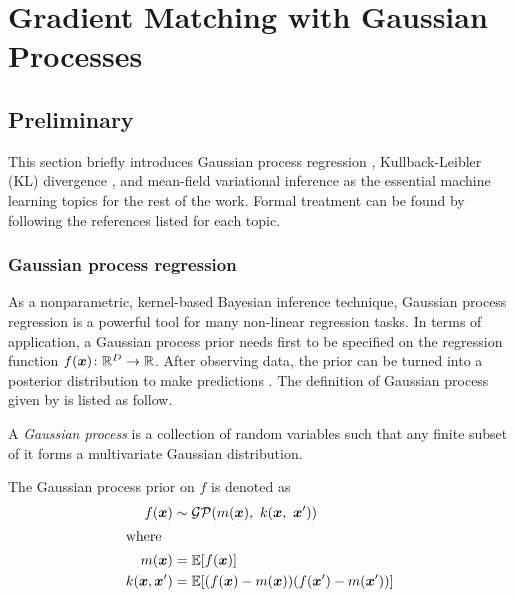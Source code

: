 \chapter{Gradient Matching with Gaussian Processes}
\label{ch-gmgp}

\section{Preliminary}
\label{sec-preliminary}
This section briefly introduces Gaussian process regression , Kullback-Leibler (KL) divergence , and mean-field variational inference  as the essential machine learning topics for the rest of the work.
Formal treatment can be found by following the references listed for each topic.

\subsection{Gaussian process regression}
\label{sec-gpr}

As a nonparametric, kernel-based Bayesian inference technique, Gaussian process regression is a powerful tool for many non-linear regression tasks.
In terms of application, a Gaussian process prior needs first to be specified on the regression function $f(\boldsymbol{x})\colon\mathbb{R}^D\rightarrow\mathbb{R}$. 
After observing data, the prior can be turned into a posterior distribution to make predictions \citep{murphy2012machine}.
The definition of Gaussian process given by \cite{rasmussen2006gaussian} is listed as follow.

\begin{definition}
A \emph{Gaussian process} is a collection of random variables such that any finite subset of it forms a multivariate Gaussian distribution.
\end{definition}

The Gaussian process prior on $f$ is denoted as
\begin{align}
    f(\mvector{x}{}) & \sim \mathcal{GP}(m(\mvector{x}),\ k(\mvector{x},\ \mvector{x}^\prime)) 
    \label{eq-gp}
    \\
    \intertext{where}
    m(\mvector{x}) &= \mathbb{E}[f(\mvector{x})]
    \label{eq-gp-mean-function}
    \\  		
    k(\mvector{x}, \mvector{x}^\prime) &= \mathbb{E}[(f(\mvector{x}) - m(\mvector{x}))(f(\mvector{x}^\prime) - m(\mvector{x}^\prime))]
    \label{eq-gp-cov-function}
\end{align}

